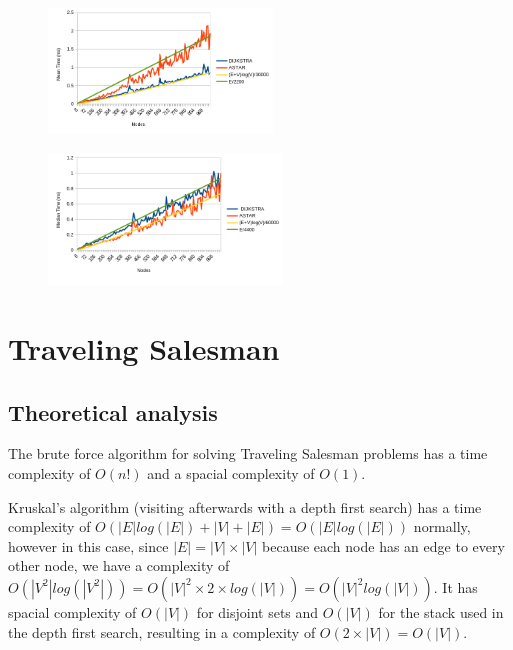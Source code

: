 \documentclass[a4paper, 12pt]{report}
\begin{document}
    \begin{figure}[H]
    \centering
    \begin{minipage}{.47\textwidth}
      \centering
      \includegraphics[width = 225px]{img/pathfindingmeantrend.png}
      \label{fig:pathmean}
    \end{minipage}%
    \hspace{.03\textwidth} 
    \begin{minipage}{.47\textwidth}
    \centering
      \includegraphics[width = 235px]{img/pathfindingmediantrend.png}
      \label{fig:pathmedian}
    \end{minipage}
    \end{figure}
    
    \section{Traveling Salesman}
    \subsection{Theoretical analysis}
    
    The brute force algorithm for solving Traveling Salesman problems has a time complexity of $O(n!)$ and a spacial complexity of $O(1)$. 
    
    Kruskal's algorithm (visiting afterwards with a depth first search) has a time complexity of $O(|E|log(|E|) + |V| + |E|) = O(|E|log(|E|))$ normally, however in this case, since $|E| = |V|\times|V|$ because each node has an edge to every other node, we have a complexity of $O(|V^2|log(|V^2|)) = O(|V|^2\times2\times log(|V|)) = O(|V|^2log(|V|))$. It has spacial complexity of $O(|V|)$ for disjoint sets and $O(|V|)$ for the stack used in the depth first search, resulting in a complexity of $O(2\times|V|) = O(|V|)$.
    
\end{document}
